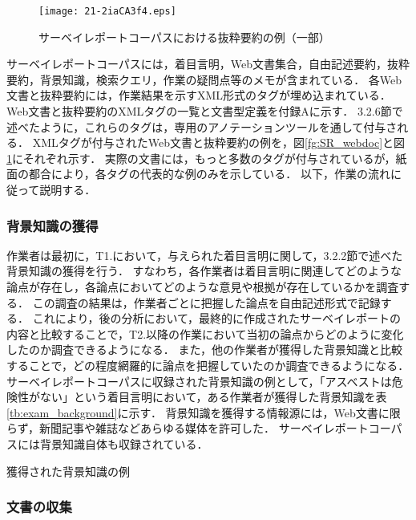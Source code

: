\documentclass[japanese]{jnlp_1.4}
\begin{document}
\begin{figure}[t]
\begin{center}
\texttt{[image: 21-2iaCA3f4.eps]}
\end{center}
 \caption{サーベイレポートコーパスにおける抜粋要約の例（一部）}
 \label{fg:SR_report}
\end{figure}
サーベイレポートコーパスには，着目言明，Web文書集合，自由記述要約，抜粋要約，背景知識，検索クエリ，作業の疑問点等のメモが含まれている．
各Web文書と抜粋要約には，作業結果を示すXML形式のタグが埋め込まれている．
{Web文書}と抜粋要約のXMLタグの一覧と文書型定義を付録Aに示す．
3.2.6節で述べたように，これらのタグは，専用のアノテーションツールを通して付与される．
{XMLタグ}が付与されたWeb文書と抜粋要約の例を，図\ref{fg:SR_webdoc}と図\ref{fg:SR_report}にそれぞれ示す．
実際の文書には，もっと多数のタグが付与されているが，紙面の都合により，各タグの代表的な例のみを示している．
以下，作業の流れに従って説明する．


\subsubsection{背景知識の獲得}

作業者は最初に，T1.において，与えられた着目言明に関して，3.2.2節で述べた背景知識の獲得を行う．
すなわち，各作業者は着目言明に関連してどのような論点が存在し，各論点においてどのような意見や根拠が存在しているかを調査する．
この調査の結果は，{作業者}ごとに把握した論点を自由記述形式で記録する．
これにより，後の分析において，最終的に作成されたサーベイレポートの内容と比較することで，T2.以降の作業において当初の論点からどのように変化したのか調査できるようになる．
また，他の作業者が獲得した背景知識と比較することで，どの程度網羅的に論点を把握していたのか調査できるようになる．
サーベイレポートコーパスに収録された背景知識{の例}として，「アスベストは危険性がない」という着目言明において，ある作業者が獲得した背景知識を表\ref{tb:exam_background}に示す．
背景知識を獲得する情報源には，Web文書に限らず，新聞記事や雑誌などあらゆる媒体を許可した．
サーベイレポートコーパスには背景知識自体も収録されている．

\begin{table}[t]
 \caption{獲得された背景知識の例}
 \label{tb:exam_background}

\end{table}


\subsubsection{文書の収集}
\end{document}
